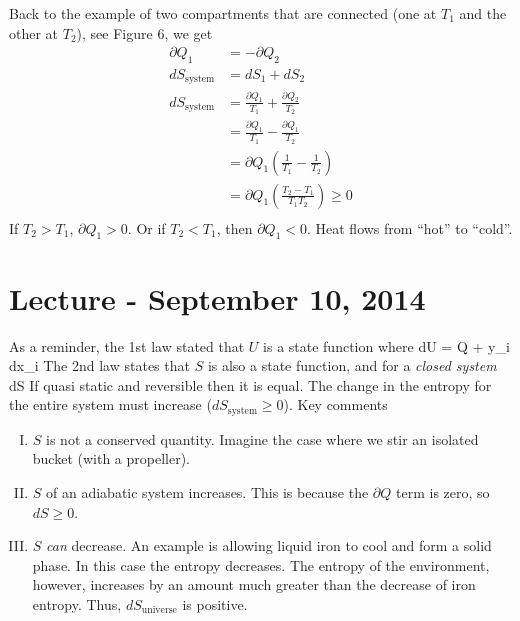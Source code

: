 \documentclass[12pt]{article}
\begin{document}
Back to the example of two compartments that are connected (one at $T_1$ and the other at $T_2$), see Figure 6, we get
\begin{align*}
\partial Q_1 &= -\partial Q_2\\
dS_\text{system} &= dS_1 + dS_2\\
dS_\text{system} &= \frac{\partial Q_1}{T_1} + \frac{\partial Q_2}{T_2}\\
&= \frac{\partial Q_1}{T_1} - \frac{\partial Q_1}{T_2}\\
&= \partial Q_1 (\frac{1}{T_1} - \frac{1}{T_2})\\
&= \partial Q_1 (\frac{T_2 - T_1}{T_1 T_2}) \geq 0\\
\end{align*}
If $T_2 > T_1$, $\partial Q_1 > 0$.  Or if $T_2 < T_1$, then $\partial Q_1 < 0$.  Heat flows from ``hot'' to ``cold''.

\section{Lecture - September 10, 2014}
As a reminder, the 1st law stated that $U$ is a state function where
\beq
dU = \partial Q + \sum y_i dx_i
\ceq
The 2nd law states that $S$ is also a state function, and for a \emph{closed system}
\beq dS \geq {} \ceq
If quasi static and reversible then it is equal.  The change in the entropy for the entire system must increase ($dS_\text{system} \geq 0$).
Key comments
\begin{enumerate}[(I)]
\item $S$ is not a conserved quantity.  Imagine the case where we stir an isolated bucket (with a propeller).
\item $S$ of an adiabatic system increases.  This is because the $\partial Q$ term is zero, so $dS \geq 0$.
\item $S$ \emph{can} decrease.  An example is allowing liquid iron to cool and form a solid phase.  In this case the entropy decreases.  The entropy of the environment, however, increases by an amount much greater than the decrease of iron entropy.  Thus, $dS_\text{universe}$ is positive.
\end{enumerate}
\end{document}

